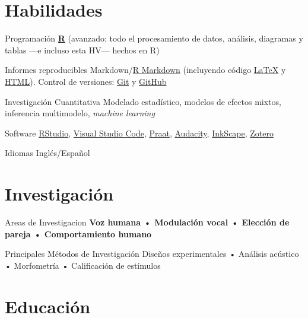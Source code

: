 \documentclass[11pt,a4paper,]{awesome-cv}
\begin{document}
\section{Habilidades}\label{habilidades}

\begin{cvskills}
  \cvskill
    {Programación}
    {\href{https://www.r-project.org/}{\textbf{R}} (avanzado: todo el procesamiento de datos, análisis, diagramas y tablas —e incluso esta HV— hechos en R)}

  \cvskill
    {Informes reproducibles}
    {Markdown/\href{https://rmarkdown.rstudio.com/}{R Markdown} (incluyendo código  \href{https://www.latex-project.org/}{{\selectfont\LaTeX}} y \href{https://html.spec.whatwg.org/}{HTML}). Control de versiones: \href{https://git-scm.com/}{Git} \faGit* y \href{https://github.com/JDLeongomez}{GitHub} \faGithub}

  \cvskill
    {Investigación Cuantitativa}
    {Modelado estadístico, modelos de efectos mixtos, inferencia multimodelo, \textit{machine learning}}

  \cvskill
    {Software}
    {\href{https://posit.co/products/open-source/rstudio/}{RStudio}, \href{https://code.visualstudio.com/}{Visual Studio Code}, \href{https://www.fon.hum.uva.nl/praat/}{Praat}, \href{https://www.audacityteam.org/}{Audacity}, \href{https://inkscape.org/}{InkScape}, \href{https://www.zotero.org/}{Zotero}}

  \cvskill
    {Idiomas}
    {Inglés/Español}
\end{cvskills}

\section{Investigación}\label{investigaciuxf3n}

\begin{cvskills}
  \cvskill
    {Areas de Investigacion}
    {\textbf{Voz humana • Modulación vocal • Elección de pareja • Comportamiento humano}}

  \cvskill
    {Principales Métodos de Investigación}
    {Diseños experimentales • Análisis acústico • Morfometría • Calificación de estímulos}
\end{cvskills}

\section{Educación}\label{educaciuxf3n}
\end{document}
